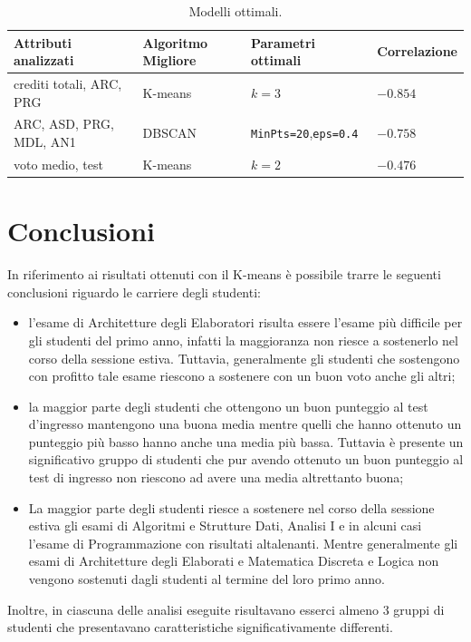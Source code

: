 \documentclass[12pt]{article}
\begin{document}
\begin{table}[H]
\begin{adjustbox}{max width=\textwidth}
\begin{tabular}{@{}llll@{}}
\toprule
Attributi analizzati     & Algoritmo Migliore & Parametri ottimali & Correlazione \\ \midrule
crediti totali, ARC, PRG & K-means            & $k=3$                & $-0.854$       \\
ARC, ASD, PRG, MDL, AN1  & DBSCAN             & \texttt{MinPts=20},\texttt{eps=0.4}  & $-0.758$ \\
voto medio, test         & K-means            & $k=2$                & $-0.476$       \\ \bottomrule
\end{tabular}
\end{adjustbox}
\caption{Modelli ottimali.}
\label{tab:mod-opt}
\end{table}

\newpage

\section{Conclusioni}
In riferimento ai risultati ottenuti con il K-means è possibile trarre le seguen\-ti conclusioni riguardo
le carriere degli studenti:
\begin{itemize}
\item l'esame di Architetture degli Elaboratori risulta essere l'esame più difficile per gli studenti del primo anno,
  infatti la maggioranza non riesce a sostenerlo nel corso della sessione estiva. Tuttavia, general\-mente gli studenti 
  che sostengono con profitto tale esame riescono a sostenere con un buon voto anche gli altri; 
\item la maggior parte degli studenti che ottengono un buon punteggio al test d'ingresso mantengono una buona media
  mentre quelli che hanno ottenuto un punteggio più basso hanno anche una media più bassa. Tuttavia è presente
  un significativo gruppo di studenti che pur avendo ottenuto un buon punteggio al test di ingresso non rie\-scono
  ad avere una media altrettanto buona;
\item La maggior parte degli studenti riesce a sostenere nel corso della sessione estiva gli esami di Algoritmi e 
  Strutture Dati, Analisi I e in alcuni casi l'esame di Programmazione con risultati altalenanti. Mentre 
  generalmente gli esami di Architetture degli Elaborati e Ma\-tematica Discreta e Logica non vengono sostenuti
  dagli studenti al termine del loro primo anno.
\end{itemize}
Inoltre, in ciascuna delle analisi eseguite risultavano esserci almeno 3 gruppi di studenti che presentavano 
caratteristiche significativamente differenti.
\end{document}
